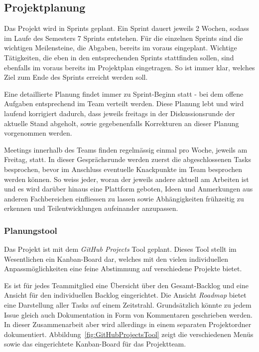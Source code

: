\documentclass[main.tex]{subfiles} %
\begin{document}

\subsection{Projektplanung}

Das Projekt wird in Sprints geplant. Ein Sprint dauert jeweils 2 Wochen, sodass
im Laufe des Semesters 7 Sprints entstehen. Für die einzelnen Sprints sind die
wichtigen Meilensteine, die Abgaben, bereits im voraus eingeplant. Wichtige
Tätigkeiten, die eben in den entsprechenden Sprints stattfinden sollen, sind
ebenfalls im voraus bereits im Projektplan eingetragen. So ist immer klar,
welches Ziel zum Ende des Sprints erreicht werden soll.

Eine detaillierte Planung findet immer zu Sprint-Beginn statt - bei dem offene
Aufgaben entsprechend im Team verteilt werden. Diese Planung lebt und wird
laufend korrigiert dadurch, dass jeweils freitags in der Diskussionsrunde der
aktuelle Stand abgeholt, sowie gegebenenfalls Korrekturen an dieser Planung
vorgenommen werden.

Meetings innerhalb des Teams finden regelmässig einmal pro Woche, jeweils am
Freitag, statt. In dieser Gesprächsrunde werden zuerst die abgeschlossenen
Tasks besprochen, bevor im Anschluss eventuelle Knackpunkte im Team besprochen
werden können. So weiss jeder, woran der jeweils andere aktuell am Arbeiten ist
und es wird darüber hinaus eine Plattform geboten, Ideen und Anmerkungen aus
anderen Fachbereichen einfliessen zu lassen sowie Abhängigkeiten frühzeitig zu
erkennen und Teilentwicklungen aufeinander anzupassen.

\subsubsection*{Planungstool}
Das Projekt ist mit dem \textit{GitHub Projects} Tool geplant. Dieses Tool stellt im Wesentlichen
ein Kanban-Board dar, welches mit den vielen individuellen Anpassmöglichkeiten eine feine
Abstimmung auf verschiedene Projekte bietet.

Es ist für jedes Teammitglied eine Übersicht über den Gesamt-Backlog und eine
Ansicht für den individuellen Backlog eingerichtet. Die Ansicht
\textit{Roadmap} bietet eine Darstellung aller Tasks auf einem Zeitstrahl.
Grundsätzlich könnte zu jedem Issue gleich auch Dokumentation in Form von
Kommentaren geschrieben werden. In dieser Zusammenarbeit aber wird allerdings
in einem separaten Projektordner dokumentiert.
Abbildung~\ref{fig:GitHubProjectsTool} zeigt die verschiedenen Menüs sowie das
eingerichtete Kanban-Board für das Projektteam.
\end{document}

